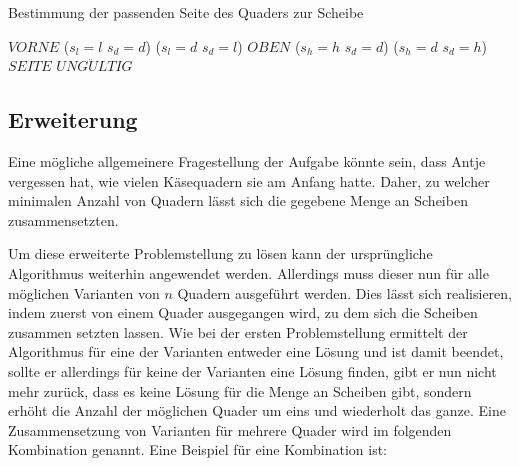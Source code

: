 \documentclass[a4paper,10pt,ngerman]{scrartcl}
\begin{document}
    \begin{algorithm}[H]
        \caption{Bestimmung der passenden Seite des Quaders zur Scheibe}
        \label{alg:cheese2}
        \begin{algorithmic}
                    \State \Return $VORNE$
                \ElsIf
                        {($s_{l} = l$ \land $s_{d} = d$) \lor ($s_{l} = d$ \land $s_{d} = l$)}
                    \State \Return $OBEN$
                \ElsIf
                        {($s_{h} = h$ \land $s_{d} = d$) \lor ($s_{h} = d$ \land $s_{d} = h$)}
                    \State \Return $SEITE$
                \Else
                    \State \Return $UNG\ddot ULTIG$
                \EndIf
            \EndFunction
        \end{algorithmic}
    \end{algorithm}

    \subsection{Erweiterung}\label{subsec:erweiterung_losungsidee}

    Eine mögliche allgemeinere Fragestellung der Aufgabe könnte sein, dass Antje vergessen hat,
    wie vielen Käsequadern sie am Anfang hatte.
    Daher, zu welcher minimalen Anzahl von Quadern lässt sich die gegebene Menge an Scheiben zusammensetzten.

    Um diese erweiterte Problemstellung zu lösen kann der ursprüngliche Algorithmus weiterhin angewendet werden.
    Allerdings muss dieser nun für alle möglichen Varianten von $n$ Quadern ausgeführt werden.
    Dies lässt sich realisieren, indem zuerst von einem Quader ausgegangen wird, zu dem sich die Scheiben zusammen setzten lassen.
    Wie bei der ersten Problemstellung ermittelt der Algorithmus für eine der Varianten entweder eine Lösung und ist damit beendet,
    sollte er allerdings für keine der Varianten eine Lösung finden, gibt er nun nicht mehr zurück, dass es keine Lösung für die Menge an Scheiben gibt,
    sondern erhöht die Anzahl der möglichen Quader um eins und wiederholt das ganze.
    Eine Zusammensetzung von Varianten für mehrere Quader wird im folgenden Kombination genannt.
    Eine Beispiel für eine Kombination ist:
\end{document}
